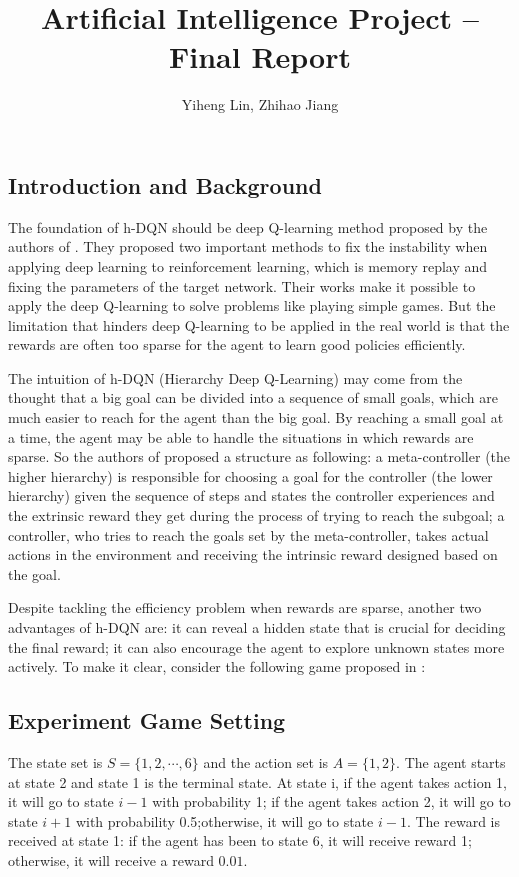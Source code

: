 \documentclass{article}
\title{\textmd{\bf Artificial Intelligence Project -- Final Report}}
\date{}
\author{Yiheng Lin, Zhihao Jiang}
\begin{document}
    \begin{spacing}{1.1}
    \maketitle %

    \section{Introduction and Background}
    The foundation of h-DQN should be deep Q-learning method proposed by the authors of \cite{AI-15}. They proposed two important methods to fix the instability when applying deep learning to reinforcement learning, which is memory replay and fixing the parameters of the target network. Their works make it possible to apply the deep Q-learning to solve problems like playing simple games. But the limitation that hinders deep Q-learning to be applied in the real world is that the rewards are often too sparse for the agent to learn good policies efficiently.

    The intuition of h-DQN (Hierarchy Deep Q-Learning) may come from the thought that a big goal can be divided into a sequence of small goals, which are much easier to reach for the agent than the big goal. By reaching a small goal at a time, the agent may be able to handle the situations in which rewards are sparse. So the authors of \cite{AI-16} proposed a structure as following: a meta-controller (the higher hierarchy) is responsible for choosing a goal for the controller (the lower hierarchy) given the sequence of steps and states the controller experiences and the extrinsic reward they get during the process of trying to reach the subgoal; a controller, who tries to reach the goals set by the meta-controller, takes actual actions in the environment and receiving the intrinsic reward designed based on the goal.

    Despite tackling the efficiency problem when rewards are sparse, another two advantages of h-DQN are: it can reveal a hidden state that is crucial for deciding the final reward; it can also encourage the agent to explore unknown states more actively. To make it clear, consider the following game proposed in \cite{AI-16}:

    \subsection{Experiment Game Setting}
    The state set is $S = \{1, 2, \cdots, 6\}$ and the action set is $A = \{1, 2\}$. The agent starts at state 2 and state 1 is the terminal state. At state i, if the agent takes action 1, it will go to state $i-1$ with probability 1; if the agent takes action 2, it will go to state $i+1$ with probability 0.5;otherwise, it will go to state $i-1$. The reward is received at state 1: if the agent has been to state 6, it will receive reward 1; otherwise, it will receive a reward $0.01$.


\end{spacing}
\end{document}
